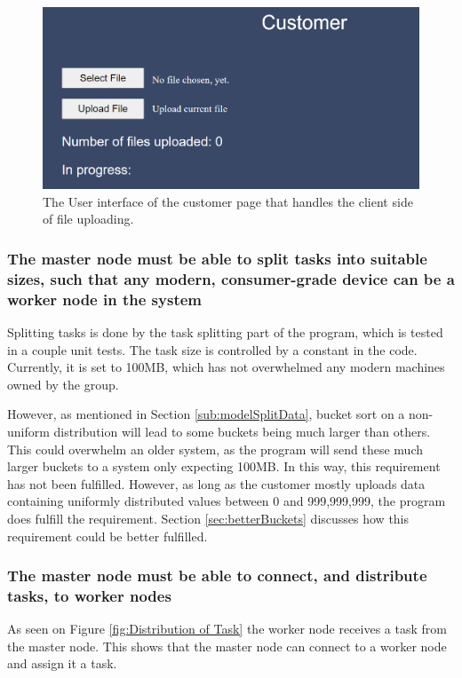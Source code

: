 \begin{figure}[H]
    \centering
    \includegraphics[scale=.3]{figures/webBasedUserInterfaceCustomer.png}
    \caption{The User interface of the customer page that handles the client side of file uploading.}
    \label{fig:my_label}
\end{figure}

\subsubsection{The master node must be able to split tasks into suitable sizes, such that any modern, consumer-grade device can be a worker node in the system} 
Splitting tasks is done by the task splitting part of the program, which is tested in a couple unit tests. The task size is controlled by a constant in the code. Currently, it is set to 100MB, which has not overwhelmed any modern machines owned by the group.

However, as mentioned in Section \ref{sub:modelSplitData}, bucket sort on a non-uniform distribution will lead to some buckets being much larger than others. This could overwhelm an older system, as the program will send these much larger buckets to a system only expecting 100MB. In this way, this requirement has not been fulfilled. However, as long as the customer mostly uploads data containing uniformly distributed values between 0 and 999,999,999, the program does fulfill the requirement. Section \ref{sec:betterBuckets} discusses how this requirement could be better fulfilled. 

\subsubsection{The master node must be able to connect, and distribute tasks, to worker nodes}
As seen on Figure \ref{fig:Distribution of Task} the worker node receives a task from the master node. This shows that the master node can connect to a worker node and assign it a task.

